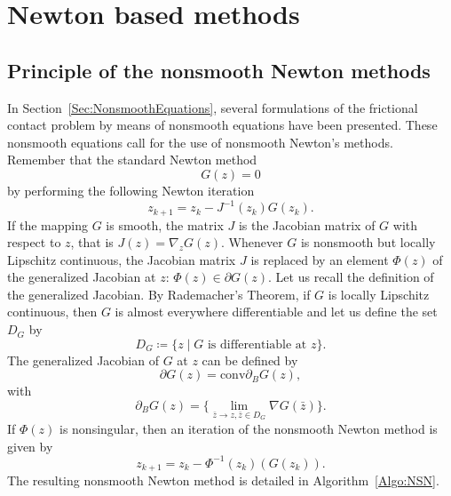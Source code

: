 {\section{Newton based methods}
\label{sec:newtonmethods}


\subsection{Principle of the nonsmooth Newton methods}

In Section~\ref{Sec:NonsmoothEquations}, several formulations of the frictional contact problem by means of nonsmooth equations  have been presented. These nonsmooth equations call for the use of nonsmooth Newton's methods. Remember that the standard Newton method 
\begin{equation}
  \label{eq:NSN1}
  G(z)=0
\end{equation}
by performing the following Newton iteration
\begin{equation}
  \label{eq:NSN2}
  z_{k+1}  =  z_k -  J^{-1}(z_k) G(z_k).
\end{equation}
If the mapping $G$ is smooth, the matrix $J$ is the Jacobian matrix of $G$ with respect to $z$, that is $J(z) = \nabla_z G(z)$.
Whenever $G$ is nonsmooth but locally Lipschitz continuous,  the Jacobian matrix $J$ is replaced by an element $\Phi(z)$ of the generalized Jacobian at $z$: $\Phi(z) \in \partial G(z)$. Let us recall the definition of the generalized Jacobian. By Rademacher's Theorem, if $G$ is locally Lipschitz continuous, then $G$ is almost everywhere differentiable and let us define the set $D_G$ by
\begin{equation}
  \label{eq:NSN4}
  D_G \coloneqq \{z \mid G \text{ is differentiable at } z\}.
\end{equation}
The generalized Jacobian of $G$ at $z$ can be defined by
\begin{equation}
  \label{eq:NSN5}
  \partial G(z) = \mbox{conv} \partial_B G(z),
\end{equation}
with
\begin{equation}
  \label{eq:NSN6}
   \partial_B G(z) = \{\lim_{\bar z \rightarrow z, \bar z\in D_G} \nabla G(\bar z)\}.
 \end{equation}
If $\Phi(z)$ is nonsingular, then an iteration of the nonsmooth Newton method is given by
\begin{equation}
  \label{eq:NSN3}
  z_{k+1}  =  z_k -  \Phi^{-1}(z_k) (G(z_k)).
\end{equation}
The resulting nonsmooth Newton method is detailed in Algorithm~\ref{Algo:NSN}.
}
